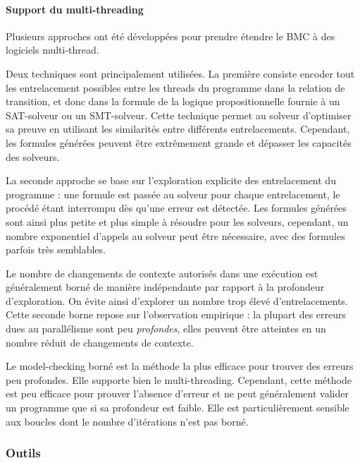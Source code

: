 \paragraph{Support du multi-threading}

Plusieurs approches ont été développées pour prendre étendre le BMC à des
logiciels multi-thread\cite{ESBMC_multithread}.

Deux techniques sont principalement utilisées.
La première consiste encoder tout les entrelacement possibles entre les threads
du programme dans la relation de transition, et donc dans la formule de la
logique propositionnelle fournie à un SAT-solveur ou un SMT-solveur. Cette
technique permet au solveur d'optimiser sa preuve en utilisant les similarités
entre différents entrelacements. Cependant, les formules générées peuvent être
extrêmement grande et dépasser les capacités des solveurs.

La seconde approche se base sur l'exploration explicite des entrelacement du
programme : une formule est passée au solveur pour chaque entrelacement, le
procédé étant interrompu dès qu'une erreur est détectée. Les formules générées
sont ainsi plus petite et plus simple à résoudre pour les solveurs, cependant,
un nombre exponentiel d'appels au solveur peut être nécessaire, avec des
formules parfois très semblables.

Le nombre de changements de contexte autorisés dans une exécution est
généralement borné de manière indépendante par rapport à la profondeur
d'exploration. On évite ainsi d'explorer un nombre trop élevé d'entrelacements.
Cette seconde borne repose sur l'observation empirique : la plupart des erreurs
dues au parallélisme sont peu \emph{profondes}, elles peuvent être atteintes en
un nombre réduit de changements de contexte.

Le model-checking borné est la méthode la plus efficace pour trouver des
erreurs peu profondes. Elle supporte bien le multi-threading. Cependant,
cette méthode est peu efficace pour prouver l'absence d'erreur et ne
peut généralement valider un programme que si sa profondeur est faible.
Elle est particulièrement sensible aux boucles dont le nombre
d'itérations n'est pas borné.

\subsubsection{Outils}

